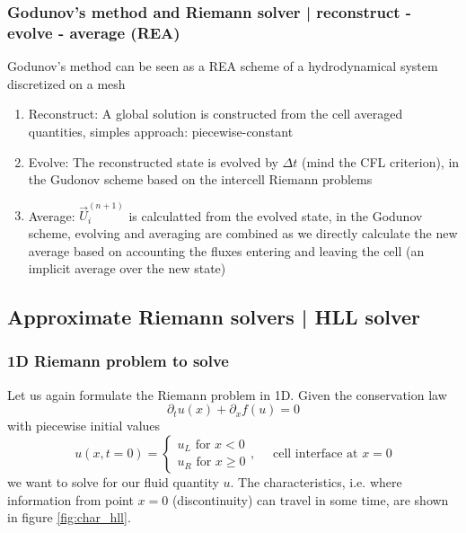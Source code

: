 \subsubsection{Godunov's method and Riemann solver | reconstruct - evolve - average (REA)}
Godunov's method can be seen as a REA scheme of a hydrodynamical system discretized on a mesh
\begin{enumerate}
    \item \textcolor{blue1}{Reconstruct:} A global solution is constructed from the cell averaged quantities, simples approach: piecewise-constant
    \item \textcolor{blue1}{Evolve:} The reconstructed state is evolved by $\Delta t$ (mind the CFL criterion), in the Gudonov scheme based on the intercell Riemann problems
    \item \textcolor{blue1}{Average:} $\vec{U}_i^{(n+1)}$ is calculatted from the evolved state, in the Godunov scheme, evolving and averaging are combined as we directly calculate the new average based on accounting the fluxes entering and leaving the cell (an implicit average over the new state)
\end{enumerate}


\subsection{Approximate Riemann solvers | HLL solver}
\subsubsection{1D Riemann problem to solve}
Let us again formulate the Riemann problem in 1D.
Given the conservation law
\begin{equation}
    \partial_t u(x) + \partial_x f(u) = 0
\end{equation}
with piecewise initial values
\begin{equation}
    u(x, t=0)=\left\{\begin{array}{l}
    u_L \text { for } x<0 \\
    u_R \text { for } x \geq 0
    \end{array}, \quad \text { cell interface at } x=0\right.
\end{equation}
we want to solve for our fluid quantity $u$. The characteristics,
i.e. where information from point $x = 0$ (discontinuity) can travel
in some time, are shown in figure \ref{fig:char_hll}.

